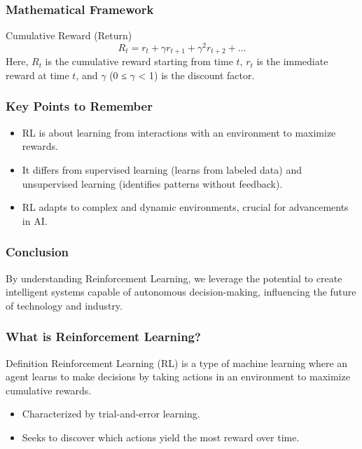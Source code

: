 \documentclass[aspectratio=169]{beamer}
\begin{document}
\begin{frame}[fragile]
    \frametitle{Mathematical Framework}
    \begin{block}{Cumulative Reward (Return)}
        \begin{equation}
            R_t = r_t + \gamma r_{t+1} + \gamma^2 r_{t+2} + \ldots
        \end{equation}
        Here, \( R_t \) is the cumulative reward starting from time \( t \), \( r_t \) is the immediate reward at time \( t \), and \( \gamma \) (0 ≤ \( \gamma \) < 1) is the discount factor.
    \end{block}
\end{frame}

\begin{frame}[fragile]
    \frametitle{Key Points to Remember}
    \begin{itemize}
        \item RL is about learning from interactions with an environment to maximize rewards.
        \item It differs from supervised learning (learns from labeled data) and unsupervised learning (identifies patterns without feedback).
        \item RL adapts to complex and dynamic environments, crucial for advancements in AI.
    \end{itemize}
\end{frame}

\begin{frame}[fragile]
    \frametitle{Conclusion}
    By understanding Reinforcement Learning, we leverage the potential to create intelligent systems capable of autonomous decision-making, influencing the future of technology and industry.
\end{frame}

\begin{frame}[fragile]
    \frametitle{What is Reinforcement Learning?}
    \begin{block}{Definition}
        Reinforcement Learning (RL) is a type of machine learning where an agent learns to make decisions by taking actions in an environment to maximize cumulative rewards. 
    \end{block}
    \begin{itemize}
        \item Characterized by trial-and-error learning.
        \item Seeks to discover which actions yield the most reward over time.
    \end{itemize}
\end{frame}
\end{document}

